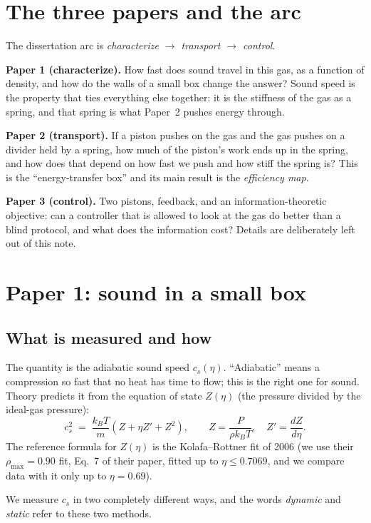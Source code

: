 \documentclass[11pt]{article}
\begin{document}
\section{The three papers and the arc}
The dissertation arc is \emph{characterize $\rightarrow$ transport $\rightarrow$ control}.

\textbf{Paper 1 (characterize).} How fast does sound travel in this gas, as a function of density, and how do the walls of a small box change the answer? Sound speed is the property that ties everything else together: it is the stiffness of the gas as a spring, and that spring is what Paper~2 pushes energy through.

\textbf{Paper 2 (transport).} If a piston pushes on the gas and the gas pushes on a divider held by a spring, how much of the piston's work ends up in the spring, and how does that depend on how fast we push and how stiff the spring is? This is the ``energy-transfer box'' and its main result is the \emph{efficiency map}.

\textbf{Paper 3 (control).} Two pistons, feedback, and an information-theoretic objective: can a controller that is allowed to look at the gas do better than a blind protocol, and what does the information cost? Details are deliberately left out of this note.

\section{Paper 1: sound in a small box}

\subsection{What is measured and how}
The quantity is the adiabatic sound speed $c_s(\eta)$. ``Adiabatic'' means a compression so fast that no heat has time to flow; this is the right one for sound. Theory predicts it from the equation of state $Z(\eta)$ (the pressure divided by the ideal-gas pressure):
\begin{equation}
c_s^2 \;=\; \frac{k_B T}{m}\left(Z + \eta Z' + Z^2\right), \qquad Z = \frac{P}{\rho k_B T}, \quad Z' = \frac{dZ}{d\eta}.
\label{eq:cs}
\end{equation}
The reference formula for $Z(\eta)$ is the Kolafa--Rottner fit of 2006 (we use their $\rho_{\max}=0.90$ fit, Eq.~7 of their paper, fitted up to $\eta \le 0.7069$, and we compare data with it only up to $\eta = 0.69$).

We measure $c_s$ in two completely different ways, and the words \emph{dynamic} and \emph{static} refer to these two methods.
\end{document}
